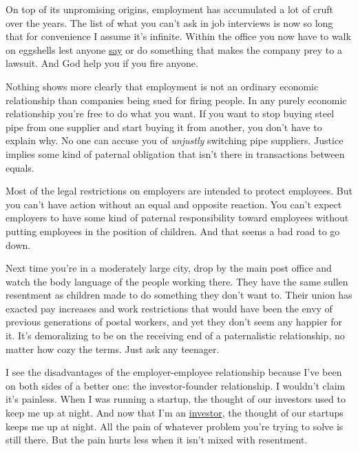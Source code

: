On top
                  of its unpromising origins, employment has accumulated a lot
                  of cruft over the years. The list of what you can't ask in job
                  interviews is now so long that for convenience I assume it's
                  infinite. Within the office you now have to walk on eggshells
                  lest anyone \href{http://www.paulgraham.com/say.html}{say} or do something that
                  makes the company prey to a lawsuit. And God help you if you
                  fire anyone.

Nothing shows more clearly that
                  employment is not an ordinary economic relationship than
                  companies being sued for firing people. In any purely economic
                  relationship you're free to do what you want. If you want to
                  stop buying steel pipe from one supplier and start buying it
                  from another, you don't have to explain why. No one can accuse
                  you of \emph{unjustly} switching pipe suppliers. Justice
                  implies some kind of paternal obligation that isn't there in
                  transactions between equals.

Most of the legal
                  restrictions on employers are intended to protect employees.
                  But you can't have action without an equal and opposite
                  reaction. You can't expect employers to have some kind of
                  paternal responsibility toward employees without putting
                  employees in the position of children. And that seems a bad
                  road to go down.

Next time you're in a moderately
                  large city, drop by the main post office and watch the body
                  language of the people working there. They have the same
                  sullen resentment as children made to do something they don't
                  want to. Their union has exacted pay increases and work
                  restrictions that would have been the envy of previous
                  generations of postal workers, and yet they don't seem any
                  happier for it. It's demoralizing to be on the receiving end
                  of a paternalistic relationship, no matter how cozy the terms.
                  Just ask any teenager.

I see the disadvantages of
                  the employer-employee relationship because I've been on both
                  sides of a better one: the investor-founder relationship. I
                  wouldn't claim it's painless. When I was running a startup,
                  the thought of our investors used to keep me up at night. And
                  now that I'm an \href{http://ycombinator.com}{investor},
                  the thought of our startups keeps me up at night. All the pain
                  of whatever problem you're trying to solve is still there. But
                  the pain hurts less when it isn't mixed with resentment.

